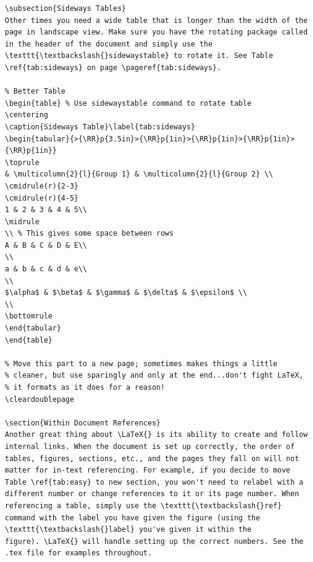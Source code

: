 \documentclass[12pt]{article}
\newcommand{\RR}{\raggedright\arraybackslash} %
\begin{document}
\begin{verbatim}
\subsection{Sideways Tables}
Other times you need a wide table that is longer than the width of the
page in landscape view. Make sure you have the rotating package called
in the header of the document and simply use the
\texttt{\textbackslash{}sidewaystable} to rotate it. See Table
\ref{tab:sideways} on page \pageref{tab:sideways}.

% Better Table
\begin{table} % Use sidewaystable command to rotate table
\centering
\caption{Sideways Table}\label{tab:sideways}
\begin{tabular}{>{\RR}p{3.5in}>{\RR}p{1in}>{\RR}p{1in}>{\RR}p{1in}>{\RR}p{1in}}
\toprule
& \multicolumn{2}{l}{Group 1} & \multicolumn{2}{l}{Group 2} \\
\cmidrule(r){2-3}
\cmidrule(r){4-5}
1 & 2 & 3 & 4 & 5\\
\midrule
\\ % This gives some space between rows
A & B & C & D & E\\
\\
a & b & c & d & e\\
\\
$\alpha$ & $\beta$ & $\gamma$ & $\delta$ & $\epsilon$ \\
\\
\bottomrule
\end{tabular}
\end{table}

% Move this part to a new page; sometimes makes things a little
% cleaner, but use sparingly and only at the end...don't fight LaTeX,
% it formats as it does for a reason!
\cleardoublepage

\section{Within Document References}
Another great thing about \LaTeX{} is its ability to create and follow
internal links. When the document is set up correctly, the order of
tables, figures, sections, etc., and the pages they fall on will not
matter for in-text referencing. For example, if you decide to move
Table \ref{tab:easy} to new section, you won't need to relabel with a
different number or change references to it or its page number. When
referencing a table, simply use the \texttt{\textbackslash{}ref}
command with the label you have given the figure (using the
\texttt{\textbackslash{}label} you've given it within the
figure). \LaTeX{} will handle setting up the correct numbers. See the
.tex file for examples throughout.


\end{verbatim}
\end{document}
